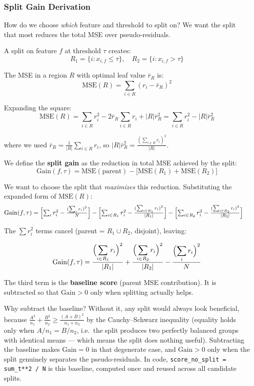 \documentclass[11pt, a4paper]{article}
\begin{document}
\subsubsection{Split Gain Derivation}

How do we choose \emph{which} feature and threshold to split on?
We want the split that most reduces the total MSE over pseudo-residuals.

A split on feature $f$ at threshold $\tau$ creates:
\[
R_1 = \{i : x_{i,f} \leq \tau\},\quad R_2 = \{i : x_{i,f} > \tau\}
\]

The MSE in a region $R$ with optimal leaf value $\bar{r}_R$ is:
\[
\mathrm{MSE}(R) = \sum_{i \in R} (r_i - \bar{r}_R)^2
\]

Expanding the square:
\[
\mathrm{MSE}(R)
= \sum_{i \in R} r_i^2 - 2\bar{r}_R \sum_{i \in R} r_i + |R|\bar{r}_R^2
= \sum_{i \in R} r_i^2 - |R|\bar{r}_R^2
\]

where we used $\bar{r}_R = \frac{1}{|R|}\sum_{i\in R}r_i$, so
$|R|\bar{r}_R^2 = \frac{(\sum_{i\in R}r_i)^2}{|R|}$.

We define the \textbf{split gain} as the reduction in total MSE achieved
by the split:
\[
\mathrm{Gain}(f,\tau)
= \mathrm{MSE}(\text{parent}) - \bigl[\mathrm{MSE}(R_1) + \mathrm{MSE}(R_2)\bigr]
\]

We want to choose the split that \emph{maximizes} this reduction.
Substituting the expanded form of $\mathrm{MSE}(R)$:
\begin{align*}
\mathrm{Gain}(f,\tau)
&= \Bigl[\textstyle\sum_i r_i^2 - \tfrac{(\sum_i r_i)^2}{N}\Bigr]
 - \Bigl[\textstyle\sum_{i\in R_1} r_i^2 - \tfrac{(\sum_{i\in R_1}r_i)^2}{|R_1|}\Bigr]
 - \Bigl[\textstyle\sum_{i\in R_2} r_i^2 - \tfrac{(\sum_{i\in R_2}r_i)^2}{|R_2|}\Bigr]
\end{align*}

The $\sum r_i^2$ terms cancel (parent = $R_1 \cup R_2$, disjoint), leaving:

\[
\mathrm{Gain}(f,\tau) =
\frac{\Bigl(\displaystyle\sum_{i \in R_1} r_i\Bigr)^2}{|R_1|}
+\frac{\Bigl(\displaystyle\sum_{i \in R_2} r_i\Bigr)^2}{|R_2|}
-\frac{\Bigl(\displaystyle\sum_{i} r_i\Bigr)^2}{N}
\]

The third term is the \textbf{baseline score} (parent MSE contribution).
It is subtracted so that $\mathrm{Gain} > 0$ only when splitting actually helps.

Why subtract the baseline? Without it, any split would always look beneficial,
because $\frac{A^2}{n_1} + \frac{B^2}{n_2} \geq \frac{(A+B)^2}{n_1+n_2}$
by the Cauchy--Schwarz inequality (equality holds only when $A/n_1 = B/n_2$,
i.e.\ the split produces two perfectly balanced groups with identical means ---
which means the split does nothing useful).
Subtracting the baseline makes $\mathrm{Gain} = 0$ in that degenerate case,
and $\mathrm{Gain} > 0$ only when the split genuinely separates the
pseudo-residuals. In code, \texttt{score\_no\_split = sum\_t**2 / N}
is this baseline, computed once and reused across all candidate splits.
\end{document}
